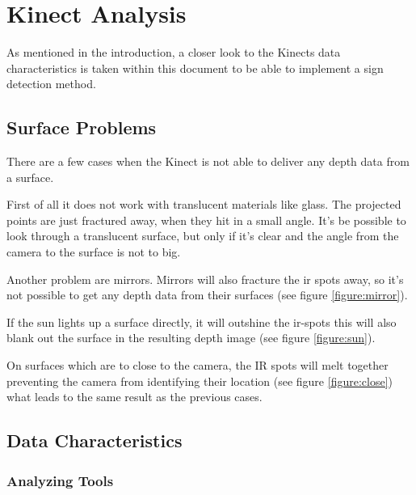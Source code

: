 \chapter{Kinect Analysis}
\graphicspath{{./KinectData/img/}}

As mentioned in the introduction, a closer look to the Kinects data characteristics is taken
within this document to be able to implement a sign detection method.

\section{Surface Problems}

There are a few cases when the Kinect is not able to deliver any depth data from a surface.

First of all it does not work with translucent materials like glass. The projected
points are just fractured away, when they hit in a small angle. It's be possible to look through 
a translucent surface, but only if it's clear and the angle from the camera to the surface is not
to big.

Another problem are mirrors. Mirrors will also fracture the ir spots away, 
so it's not possible to get any depth data from their surfaces (see figure \vref{figure:mirror}).

If the sun lights up a surface directly, it will outshine the ir-spots this will also blank out the surface
in the resulting depth image (see figure \vref{figure:sun}).

On surfaces which are to close to the camera, the IR spots will melt together preventing the camera from
identifying their location (see figure \vref{figure:close}) what leads to the same result as the previous cases.

\section{Data Characteristics} 

\subsection{Analyzing Tools}

